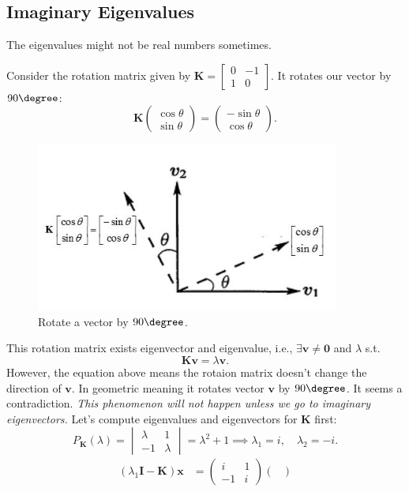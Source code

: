 \subsection{Imaginary Eigenvalues}
The eigenvalues might not be real numbers sometimes.
\begin{example}\label{Exp:7:6}
Consider the rotation matrix given by $\bm K=\begin{bmatrix}
0&-1\\1&0
\end{bmatrix}$. It rotates our vector by $90\degree$:
\[
\bm K\begin{pmatrix}
\cos\theta\\\sin\theta
\end{pmatrix}=\begin{pmatrix}
-\sin\theta\\\cos\theta
\end{pmatrix}.
\]
\begin{figure}[H]
\centering
\includegraphics[width=10cm]{week6/rotation}
\caption{Rotate a vector by $90\degree$.}
\end{figure}
This rotation matrix exists eigenvector and eigenvalue, i.e., $\exists\bm v\ne\bm 0$ and $\lambda$ s.t. 
\[\bm K\bm v=\lambda\bm v.\] 
However, the equation above means the rotaion matrix doesn't change the direction of $\bm v$. In geometric meaning it rotates vector $\bm v$ by $90\degree$. It seems a contradiction. \emph{This phenomenon will not happen unless we go to imaginary eigenvectors.} Let's compute eigenvalues and eigenvectors for $\bm K$ first:
\[
P_{\bm K}(\lambda)=\begin{vmatrix}
\lambda&1\\-1&\lambda\end{vmatrix}
=\lambda^2+1
\implies
\lambda_1=i,\quad\lambda_2=-i.
\]
\begin{align*}
(\lambda_1\bm I-\bm K)\bm x&=\begin{pmatrix}
i&1\\-1&i
\end{pmatrix}\begin{pmatrix}

\end{pmatrix}
\end{align*}
\end{example}
